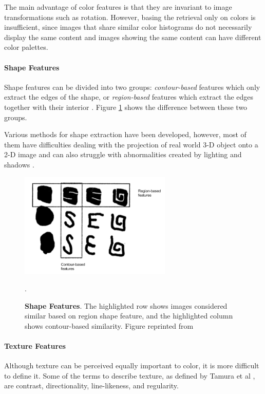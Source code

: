 \documentclass[12pt]{report}
\begin{document}
The main advantage of color features is that they are invariant to image transformations such as rotation. However, basing the retrieval only on colors is insufficient, since images that share similar color histograms do not necessarily display the same content and images showing the same content can have different color palettes.


\paragraph{Shape Features}
Shape features can be divided into two groups: \textit{contour-based} features which only extract the edges of the shape, or \textit{region-based} features which extract the edges together with their interior \cite{zhang2004review}. Figure \ref{fig:shape_feat} shows the difference between these two groups.

Various methods for shape extraction have been developed, however, most of them have difficulties dealing with the projection of real world 3-D object onto a 2-D image and can also struggle with abnormalities created by lighting and shadows \cite{zhang2004review}.

\begin{figure}[h]
\centering
{\includegraphics[height=5cm]{02_background/CBIR/shape_features}}
\caption{\label{fig:shape_feat} \textbf{Shape Features}. The highlighted row shows images considered similar based on region shape feature, and the highlighted column shows contour-based similarity. Figure reprinted from \cite{bober_mpeg-7_2001}}.
\end{figure}

\paragraph{Texture Features}
Although texture can be perceived equally important to color, it is more difficult to define it.  Some of the terms to describe texture, as defined by Tamura et al \cite{tamura1978textural}, are contrast, directionality, line-likeness, and regularity.
\end{document}
